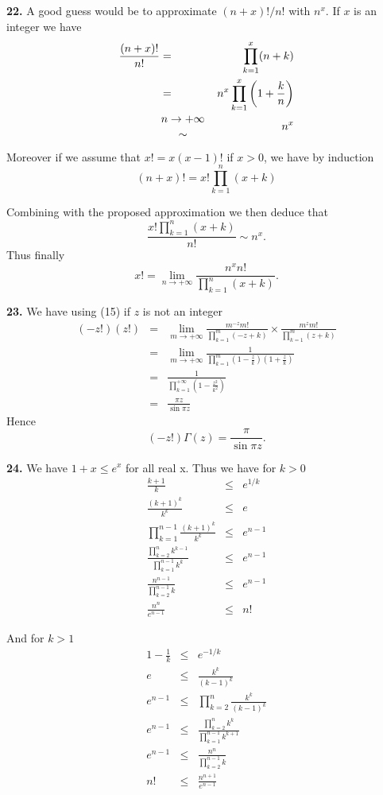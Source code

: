\documentclass[a4paper,12pt]{article}
\newcommand{\newpar}[1]{\bigskip \noindent \textbf{#1.}}
\newcommand{\ra}{\rightarrow}
\begin{document}
\newpar{22} A good guess would be to approximate $(n + x)!/n!$ with
$n^x$.  If $x$ is an integer we have
\begin{eqnarray*}
  \frac{(n+x)!}{n!} &=& \prod_{k=1}^x (n+k) \\
  &=& n^x \prod_{k=1}^x\left(1 + \frac{k}{n}\right) \\
  &{n \ra +\infty \atop \sim}& n^x
\end{eqnarray*}

Moreover if we assume that $x! = x (x-1)!$ if $x>0$, we have by induction
\[ (n+x)! = x! \prod_{k=1}^n (x+k)\]

Combining with the proposed approximation we then deduce that
\[ \frac{x! \prod_{k=1}^n(x+k)}{n!} \sim n^x.\]
Thus finally
\[ x! = \lim_{n\ra +\infty} \frac{n^x n!}{\prod_{k=1}^n(x+k)}.\]

\newpar{23} We have using (15) if $z$ is not an integer
\begin{eqnarray*}
  (-z!)(z!) &=& \lim_{m\ra +\infty} \frac{m^{-z} m!}{\prod_{k=1}^m(-z
    + k)} \times \frac{m^z m!}{\prod_{k=1}^m (z+k)} \\
  &=& \lim_{m\ra +\infty} \frac{1}{\prod_{k=1}^m
    \left(1-\frac{z}{k}\right) \left(1+\frac{z}{k}\right)} \\
  &=& \frac{1}{\prod_{k=1}^{+\infty} \left(1 -
    \frac{z^2}{k^2}\right)}\\
  &=& \frac{\pi z} {\sin \pi z}
\end{eqnarray*}
Hence
\[ (-z!) \Gamma(z) = \frac{\pi}{\sin \pi z}.\]

\newpar{24} We have $1+x\le e^x$ for all real x.  Thus we have for $k >0$
\begin{eqnarray*}
  \frac{k+1}{k} &\le& e^{1/k} \\
  \frac{(k+1)^k}{k^k} &\le& e \\
  \prod_{k=1}^{n-1} \frac{(k+1)^k}{k^k} &\le& e^{n-1} \\
  \frac{\prod_{k=2}^n k^{k-1}}{\prod_{k=1}^{n-1} k^k} &\le& e^{n-1} \\
  \frac{n^{n-1}}{\prod_{k=2}^{n-1}k} &\le& e^{n-1} \\
  \frac{n^n}{e^{n-1}} &\le& n!
\end{eqnarray*}

And for $k>1$
\begin{eqnarray*}
  1 - \frac{1}{k} &\le& e^{-1/k} \\
  e &\le& \frac{k^k}{(k-1)^k} \\
  e^{n-1} &\le& \prod_{k=2}^n \frac{k^k}{(k-1)^k} \\
  e^{n-1} &\le& \frac{\prod_{k=2}^n k^k}{\prod_{k=1}^{n-1}k^{k+1}} \\
  e^{n-1} &\le& \frac{n^n}{\prod_{k=2}^{n-1}k} \\
  n! &\le& \frac{n^{n+1}}{e^{n-1}}
\end{eqnarray*}
\end{document}
